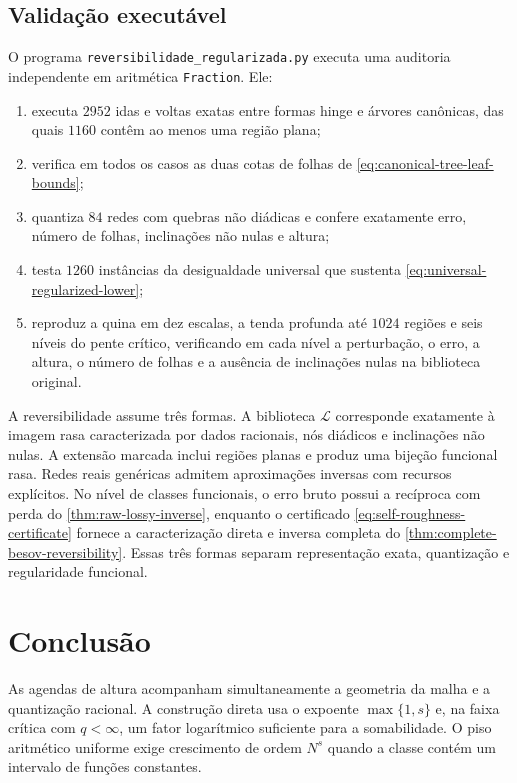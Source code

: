 \documentclass[11pt,a4paper]{article}
\theoremstyle{definition}
\theoremstyle{remark}
\newcommand{\Library}{\mathcal{L}}
\begin{document}
\subsection{Validação executável}

O programa \texttt{reversibilidade\_regularizada.py} executa uma auditoria
independente em aritmética \texttt{Fraction}. Ele:
\begin{enumerate}[label=(\roman*),leftmargin=2.2em]
 \item executa $2952$ idas e voltas exatas entre formas hinge e árvores
 canônicas, das quais $1160$ contêm ao menos uma região plana;
 \item verifica em todos os casos as duas cotas de folhas de
 \eqref{eq:canonical-tree-leaf-bounds};
 \item quantiza $84$ redes com quebras não diádicas e confere exatamente erro,
 número de folhas, inclinações não nulas e altura;
 \item testa $1260$ instâncias da desigualdade universal que sustenta
 \eqref{eq:universal-regularized-lower};
 \item reproduz a quina em dez escalas, a tenda profunda até $1024$ regiões e
 seis níveis do pente crítico, verificando em cada nível a perturbação, o erro,
 a altura, o número de folhas e a ausência de inclinações nulas na biblioteca
 original.
\end{enumerate}

A reversibilidade assume três formas. A biblioteca $\Library$ corresponde
exatamente à imagem rasa caracterizada por dados racionais, nós diádicos e
inclinações não nulas. A extensão marcada inclui regiões planas e produz uma
bijeção funcional rasa. Redes reais genéricas admitem aproximações inversas
com recursos explícitos. No nível de classes funcionais, o erro bruto possui a recíproca com perda do
\cref{thm:raw-lossy-inverse}, enquanto o certificado
\eqref{eq:self-roughness-certificate} fornece a caracterização direta e
inversa completa do \cref{thm:complete-besov-reversibility}. Essas três formas
separam representação exata, quantização e regularidade funcional.
\section{Conclusão}
As agendas de altura acompanham simultaneamente a geometria da malha e a quantização racional. A construção direta usa o expoente $\max\{1,s\}$ e, na faixa crítica com $q<\infty$, um fator logarítmico suficiente para a somabilidade. O piso aritmético uniforme exige crescimento de ordem $N^s$ quando a classe contém um intervalo de funções constantes.
\end{document}
